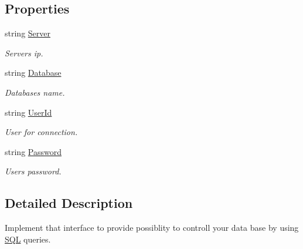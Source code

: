 \subsection*{Properties}
\begin{DoxyCompactItemize}
\item 
string \mbox{\hyperlink{interface_uniform_data_operator_1_1_s_q_l_1_1_i_s_q_l_operator_af3e81967d2c0d3457e96d3c41f4c6712}{Server}}
\begin{DoxyCompactList}\small\item\em Server\textquotesingle{}s ip. \end{DoxyCompactList}\item 
string \mbox{\hyperlink{interface_uniform_data_operator_1_1_s_q_l_1_1_i_s_q_l_operator_a03fee3fec4e4915a540af2b9ac6ecb30}{Database}}
\begin{DoxyCompactList}\small\item\em Database\textquotesingle{}s name. \end{DoxyCompactList}\item 
string \mbox{\hyperlink{interface_uniform_data_operator_1_1_s_q_l_1_1_i_s_q_l_operator_a47f3c169274d8efefa64a777e0b06b51}{User\+Id}}
\begin{DoxyCompactList}\small\item\em User for connection. \end{DoxyCompactList}\item 
string \mbox{\hyperlink{interface_uniform_data_operator_1_1_s_q_l_1_1_i_s_q_l_operator_ad4696c7f2d90f7ba0eed37013c812b0a}{Password}}
\begin{DoxyCompactList}\small\item\em User\textquotesingle{}s password. \end{DoxyCompactList}\end{DoxyCompactItemize}


\subsection{Detailed Description}
Implement that interface to provide possiblity to controll your data base by using \mbox{\hyperlink{namespace_uniform_data_operator_1_1_s_q_l}{S\+QL}} queries. 



